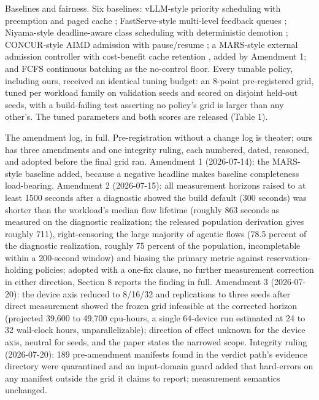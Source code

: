 Baselines and fairness. Six baselines: vLLM-style priority scheduling with
preemption and paged cache \citep{vllm2023}; FastServe-style multi-level feedback
queues \citep{wu2023fastserve}; Niyama-style deadline-aware class scheduling with
deterministic demotion \citep{niyama2025}; CONCUR-style AIMD admission with
pause/resume \citep{concur2026}; a MARS-style external admission controller with
cost-benefit cache retention \citep{mars2026}, added by Amendment 1; and FCFS
continuous batching as the no-control floor. Every tunable policy,
including ours, received an identical tuning budget: an 8-point
pre-registered grid, tuned per workload family on validation seeds and
scored on disjoint held-out seeds, with a build-failing test asserting no
policy's grid is larger than any other's. The tuned parameters and both
scores are released (Table 1).

The amendment log, in full. Pre-registration without a change log is
theater; ours has three amendments and one integrity ruling, each numbered,
dated, reasoned, and adopted before the final grid ran. Amendment 1
(2026-07-14): the MARS-style baseline added, because a negative headline
makes baseline completeness load-bearing. Amendment 2 (2026-07-15): all
measurement horizons raised to at least 1500 seconds after a diagnostic
showed the build default (300 seconds) was shorter than the workload's
median flow lifetime (roughly 863 seconds as measured on the diagnostic
realization; the released population derivation gives roughly 711),
right-censoring the large majority of agentic flows (78.5 percent of the
diagnostic realization, roughly 75 percent of the population,
incompletable within a 200-second window) and biasing the primary metric against
reservation-holding policies; adopted with a one-fix clause, no further
measurement correction in either direction, Section 8 reports the finding
in full. Amendment 3 (2026-07-20): the device axis reduced to 8/16/32 and
replications to three seeds after direct measurement showed the frozen grid
infeasible at the corrected horizon (projected 39,600 to 49,700 cpu-hours, a single 64-device run
estimated at 24 to 32 wall-clock hours, unparallelizable); direction of effect unknown for the
device axis, neutral for seeds, and the paper states the narrowed scope.
Integrity ruling (2026-07-20): 189 pre-amendment manifests found in the
verdict path's evidence directory were quarantined and an input-domain
guard added that hard-errors on any manifest outside the grid it claims to
report; measurement semantics unchanged.
